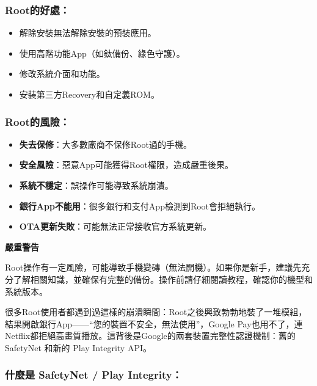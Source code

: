 \subsubsection*{Root的好處：}

\begin{itemize}
  \item 解除安裝無法解除安裝的預裝應用。
  \item 使用高階功能App（如鈦備份、綠色守護）。
  \item 修改系統介面和功能。
  \item 安裝第三方Recovery和自定義ROM。
\end{itemize}

\subsubsection*{Root的風險：}

\begin{itemize}
  \item \textbf{失去保修}：大多數廠商不保修Root過的手機。
  \item \textbf{安全風險}：惡意App可能獲得Root權限，造成嚴重後果。
  \item \textbf{系統不穩定}：誤操作可能導致系統崩潰。
  \item \textbf{銀行App不能用}：很多銀行和支付App檢測到Root會拒絕執行。
  \item \textbf{OTA更新失敗}：可能無法正常接收官方系統更新。
\end{itemize}

\textbf{嚴重警告}\par

Root操作有一定風險，可能導致手機變磚（無法開機）。如果你是新手，建議先充分了解相關知識，並確保有完整的備份。操作前請仔細閱讀教程，確認你的機型和系統版本。


很多Root使用者都遇到過這樣的崩潰瞬間：Root之後興致勃勃地裝了一堆模組，結果開啟銀行App——“您的裝置不安全，無法使用”，Google Pay也用不了，連Netflix都拒絕高畫質播放。這背後是Google的兩套裝置完整性認證機制：舊的 SafetyNet 和新的 Play Integrity API。

\subsubsection*{什麼是 SafetyNet / Play Integrity：}

